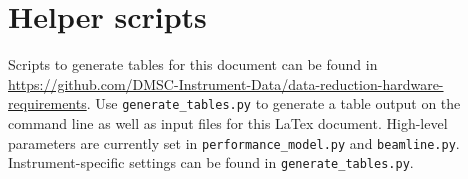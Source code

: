 \documentclass[a4paper,english,numbers=noenddot,bibliography=totoc,chapterprefix=on,DIV=12]{scrartcl}
\begin{document}
\section{Helper scripts}
\label{app:scripts}

Scripts to generate tables for this document can be found in \url{https://github.com/DMSC-Instrument-Data/data-reduction-hardware-requirements}.
Use \verb|generate_tables.py| to generate a table output on the command line as well as input files for this LaTex document.
High-level parameters are currently set in \verb|performance_model.py| and \verb|beamline.py|.
Instrument-specific settings can be found in \verb|generate_tables.py|.
\end{document}
